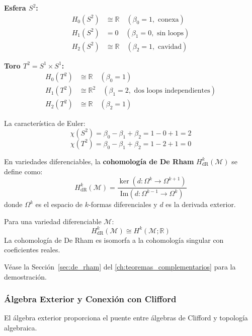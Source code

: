 \begin{example}\label{ex:homologia_esfera_toro}
\textbf{Esfera $S^2$:}
\begin{align}
H_0(S^2) &\cong \mathbb{R} \quad (\beta_0 = 1, \text{ conexa}) \\
H_1(S^2) &= 0 \quad (\beta_1 = 0, \text{ sin loops}) \\
H_2(S^2) &\cong \mathbb{R} \quad (\beta_2 = 1, \text{ cavidad})
\end{align}

\textbf{Toro $T^2 = S^1 \times S^1$:}
\begin{align}
H_0(T^2) &\cong \mathbb{R} \quad (\beta_0 = 1) \\
H_1(T^2) &\cong \mathbb{R}^2 \quad (\beta_1 = 2, \text{ dos loops independientes}) \\
H_2(T^2) &\cong \mathbb{R} \quad (\beta_2 = 1)
\end{align}

La característica de Euler:
\[\chi(S^2) = \beta_0 - \beta_1 + \beta_2 = 1 - 0 + 1 = 2\]
\[\chi(T^2) = \beta_0 - \beta_1 + \beta_2 = 1 - 2 + 1 = 0\]
\end{example}

\begin{definition}\label{def:cohomologia_derham}
En variedades diferenciables, la \textbf{cohomología de De Rham} $H^k_{\text{dR}}(\mathcal{M})$ se define como:
\[H^k_{\text{dR}}(\mathcal{M}) = \frac{\ker(d: \Omega^k \to \Omega^{k+1})}{\text{Im}(d: \Omega^{k-1} \to \Omega^k)}\]
donde $\Omega^k$ es el espacio de $k$-formas diferenciales y $d$ es la derivada exterior.
\end{definition}

\begin{theorem}\label{thm:derham}
Para una variedad diferenciable $\mathcal{M}$:
\[H^k_{\text{dR}}(\mathcal{M}) \cong H^k(\mathcal{M}; \mathbb{R})\]
La cohomología de De Rham es isomorfa a la cohomología singular con coeficientes reales.

Véase la Sección~\ref{sec:de_rham} del \autoref{ch:teoremas_complementarios} para la demostración.
\end{theorem}

\subsubsection{Álgebra Exterior y Conexión con Clifford}

El álgebra exterior proporciona el puente entre álgebras de Clifford y topología algebraica.

